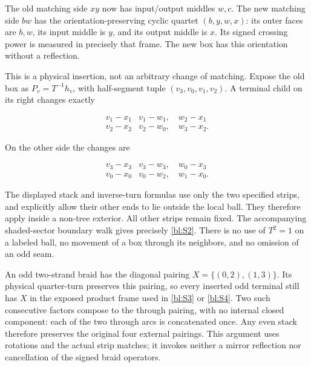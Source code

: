 The old matching side \(xy\) now has input/output middles \(w,c\). The new matching side \(bw\) has the orientation-preserving cyclic quartet \((b,y,w,x)\): its outer faces are \(b,w\), its input middle is \(y\), and its output middle is \(x\). Its signed crossing power is measured in precisely that frame. The new box has this orientation without a reflection.

This is a physical insertion, not an arbitrary change of matching. Expose the old box as \(P_v=T^{-1}h_v\), with half-segment tuple \((v_3,v_0,v_1,v_2)\). A terminal child on its right changes exactly

\begin{equation}\label{bl:S3}
\begin{array}{c|c}
 v_1-x_1&v_1-w_1,\quad w_2-x_1\\
 v_2-x_2&v_2-w_0,\quad w_3-x_2 .
 \end{array}
\end{equation}

On the other side the changes are

\begin{equation}\label{bl:S4}
\begin{array}{c|c}
 v_3-x_3&v_3-w_3,\quad w_0-x_3\\
 v_0-x_0&v_0-w_2,\quad w_1-x_0 .
 \end{array}
\end{equation}

The displayed stack and inverse-turn formulas use only the two specified strips, and explicitly allow their other ends to lie outside the local ball. They therefore apply inside a non-tree exterior. All other strips remain fixed. The accompanying shaded-sector boundary walk gives precisely \eqref{bl:S2}. There is no use of \(T^2=1\) on a labeled ball, no movement of a box through its neighbors, and no omission of an odd seam.

An odd two-strand braid has the diagonal pairing \(X=\{(0,2),(1,3)\}\). Its physical quarter-turn preserves this pairing, so every inserted odd terminal still has \(X\) in the exposed product frame used in \eqref{bl:S3} or \eqref{bl:S4}. Two such consecutive factors compose to the through pairing, with no internal closed component: each of the two through arcs is concatenated once. Any even stack therefore preserves the original four external pairings. This argument uses rotations and the actual strip matches; it invokes neither a mirror reflection nor cancellation of the signed braid operators.

